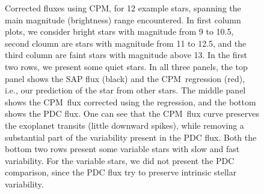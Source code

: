 \documentclass[12pt, preprint]{aastex}
\newcommand{\name}{CPM}
\begin{document}
\begin{figure}[p]
\caption{
  \label{fluxes} 
  Corrected fluxes using \name, for 12 example stars, 
    spanning the main magnitude (brightness) range encountered. 
  In first column plots, we consider bright stars with magnitude from 9 to 10.5, 
    second cloumn are stars with magnitude from 11 to 12.5,  
    and the third column are faint stars with magnitude above 13. 
  In the first two rows, we present some quiet stars. 
  In all three panels, the top panel shows the SAP flux (black) and the \name\ regression (red), 
    i.e., our prediction of the star from other stars. 
  The middle panel shows the \name\ flux corrected using the regression, and the bottom shows the PDC flux. 
  One can see that the \name\ flux curve preserves the exoplanet transits (little downward spikes), 
    while removing a substantial part of the variability present in the PDC flux. 
  Both the bottom two rows present some variable stars with slow and fast variability. 
  For the variable stars, we did not present the PDC comparison, 
    since the PDC flux try to preserve intrinsic stellar variability.}
\end{figure}
\end{document}

